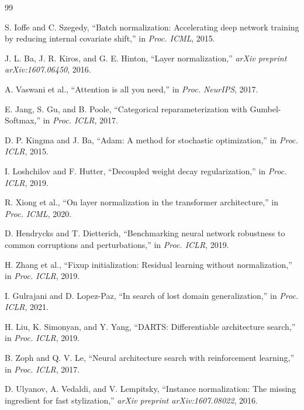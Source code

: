 \documentclass[final,3p,times,twocolumn]{elsarticle}
\begin{document}
\begin{thebibliography}{99}

S. Ioffe and C. Szegedy, ``Batch normalization: Accelerating deep
network training by reducing internal covariate shift,'' in
\textit{Proc. ICML}, 2015.

J. L. Ba, J. R. Kiros, and G. E. Hinton, ``Layer normalization,''
\textit{arXiv preprint arXiv:1607.06450}, 2016.

A. Vaswani et al., ``Attention is all you need,'' in \textit{Proc.
NeurIPS}, 2017.

E. Jang, S. Gu, and B. Poole, ``Categorical reparameterization with
Gumbel-Softmax,'' in \textit{Proc. ICLR}, 2017.

D. P. Kingma and J. Ba, ``Adam: A method for stochastic optimization,''
in \textit{Proc. ICLR}, 2015.

I. Loshchilov and F. Hutter, ``Decoupled weight decay regularization,''
in \textit{Proc. ICLR}, 2019.

R. Xiong et al., ``On layer normalization in the transformer
architecture,'' in \textit{Proc. ICML}, 2020.

D. Hendrycks and T. Dietterich, ``Benchmarking neural network
robustness to common corruptions and perturbations,'' in \textit{Proc.
ICLR}, 2019.

H. Zhang et al., ``Fixup initialization: Residual learning without
normalization,'' in \textit{Proc. ICLR}, 2019.

I. Gulrajani and D. Lopez-Paz, ``In search of lost domain
generalization,'' in \textit{Proc. ICLR}, 2021.

H. Liu, K. Simonyan, and Y. Yang, ``DARTS: Differentiable architecture
search,'' in \textit{Proc. ICLR}, 2019.

B. Zoph and Q. V. Le, ``Neural architecture search with reinforcement
learning,'' in \textit{Proc. ICLR}, 2017.

D. Ulyanov, A. Vedaldi, and V. Lempitsky, ``Instance normalization:
The missing ingredient for fast stylization,'' \textit{arXiv preprint
arXiv:1607.08022}, 2016.


\end{thebibliography}
\end{document}
